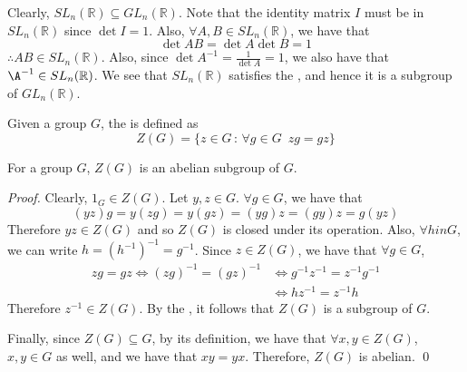 \documentclass[notoc,notitlepage]{tufte-book}
\begin{document}
\begin{eg}
  Clearly, $SL_n(\mathbb{R}) \subseteq GL_n(\mathbb{R})$. Note that the identity matrix $I$ must be in $SL_n(\mathbb{R})$ since $\det I = 1$. Also, $\forall A, B \in SL_n(\mathbb{R})$, we have that
  \begin{equation*}
    \det AB = \det A \det B = 1
  \end{equation*}
  $\therefore AB \in SL_n(\mathbb{R})$. Also, since $\det A^{-1} = \frac{1}{\det A} = 1$, we also have that $\A^{-1} \in SL_n(\mathbb{R})$. We see that $SL_n(\mathbb{R})$ satisfies the , and hence it is a subgroup of $GL_n(\mathbb{R})$.
\end{eg}

\begin{defn}\label{defn:center_of_a_group}
  Given a group $G$, the  is defined as
  \begin{equation*}
    Z(G) = \{z \in G \, : \, \forall g \in G \enspace zg = gz \}
  \end{equation*}
\end{defn}

\begin{eg}
  For a group $G$, $Z(G)$ is an abelian subgroup of $G$.

  \begin{proof}
    Clearly, $1_G \in Z(G)$. Let $y, z \in G$. $\forall g \in G$, we have that
    \begin{equation*}
      (yz)g = y(zg) = y(gz) = (yg)z = (gy)z = g(yz)
    \end{equation*}
    Therefore $yz \in Z(G)$ and so $Z(G)$ is closed under its operation. Also, $\forall h 
    in G$, we can write $h = (h^{-1})^{-1} = g^{-1}$. Since $z \in Z(G)$, we have that $\forall g \in G$,
    \begin{align*}
      zg = gz \iff (zg)^{-1} = (gz)^{-1} &\iff g^{-1} z^{-1} = z^{-1} g^{-1} \\
          &\iff hz^{-1} = z^{-1} h
    \end{align*}
    Therefore $z^{-1} \in Z(G)$. By the , it follows that $Z(G)$ is a subgroup of $G$.

    Finally, since $Z(G) \subseteq G$, by its definition, we have that $\forall x, y \in Z(G)$, $x, y \in G$ as well, and we have that $xy = yx$. Therefore, $Z(G)$ is abelian. \qed
  \end{proof}
\end{eg}
\end{document}
